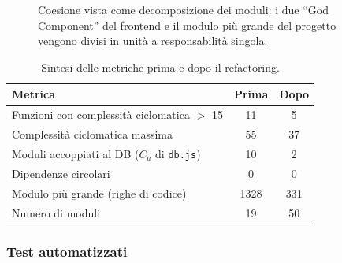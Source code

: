 \begin{figure}[H]
    \centering
    \caption{Coesione vista come decomposizione dei moduli: i due ``God
    Component'' del frontend e il modulo più grande del progetto vengono divisi
    in unità a responsabilità singola.}
    \label{fig:ref-coesione}
\end{figure}

\begin{table}[H]
    \centering
    \begin{tabular}{lcc}
        \hline
        \textbf{Metrica} & \textbf{Prima} & \textbf{Dopo} \\
        \hline
        Funzioni con complessità ciclomatica ${}>{}$ 15 & 11 & 5 \\
        Complessità ciclomatica massima                  & 55 & 37 \\
        Moduli accoppiati al DB ($C_a$ di \texttt{db.js}) & 10 & 2 \\
        Dipendenze circolari                              & 0  & 0 \\
        Modulo più grande (righe di codice)               & 1328 & 331 \\
        Numero di moduli                                  & 19 & 50 \\
        \hline
    \end{tabular}
    \caption{Sintesi delle metriche prima e dopo il refactoring.}
    \label{tab:ref-metriche}
\end{table}

\newpage 
\subsubsection{Test automatizzati}

